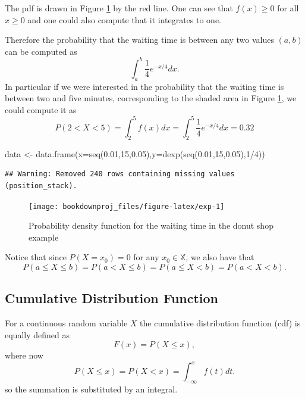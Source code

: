 \documentclass[
]{book}
\newenvironment{Shaded}{\begin{snugshade}}{\end{snugshade}}
\newcommand{\AttributeTok}[1]{\textcolor[rgb]{0.77,0.63,0.00}{#1}}
\newcommand{\DecValTok}[1]{\textcolor[rgb]{0.00,0.00,0.81}{#1}}
\newcommand{\FloatTok}[1]{\textcolor[rgb]{0.00,0.00,0.81}{#1}}
\newcommand{\FunctionTok}[1]{\textcolor[rgb]{0.00,0.00,0.00}{#1}}
\newcommand{\NormalTok}[1]{#1}
\newcommand{\OtherTok}[1]{\textcolor[rgb]{0.56,0.35,0.01}{#1}}
\newcommand{\SpecialCharTok}[1]{\textcolor[rgb]{0.00,0.00,0.00}{#1}}
\theoremstyle{definition}
\theoremstyle{definition}
\theoremstyle{definition}
\theoremstyle{definition}
\theoremstyle{remark}
\begin{document}
The pdf is drawn in Figure \ref{fig:exp} by the red line. One can see that \(f(x)\geq 0\) for all \(x\geq 0\) and one could also compute that it integrates to one.

Therefore the probability that the waiting time is between any two values \((a,b)\) can be computed as
\[
\int_a^b\frac{1}{4}e^{-x/4}dx.
\]
In particular if we were interested in the probability that the waiting time is between two and five minutes, corresponding to the shaded area in Figure \ref{fig:exp}, we could compute it as
\[
P(2<X<5)=\int_2^5f(x)dx=\int_{2}^5\frac{1}{4}e^{-x/4}dx= 0.32
\]

\begin{Shaded}
\begin{Highlighting}[]
\NormalTok{data }\OtherTok{\textless{}{-}} \FunctionTok{data.frame}\NormalTok{(}\AttributeTok{x=}\FunctionTok{seq}\NormalTok{(}\FloatTok{0.01}\NormalTok{,}\DecValTok{15}\NormalTok{,}\FloatTok{0.05}\NormalTok{),}\AttributeTok{y=}\FunctionTok{dexp}\NormalTok{(}\FunctionTok{seq}\NormalTok{(}\FloatTok{0.01}\NormalTok{,}\DecValTok{15}\NormalTok{,}\FloatTok{0.05}\NormalTok{),}\DecValTok{1}\SpecialCharTok{/}\DecValTok{4}\NormalTok{))}
\end{Highlighting}
\end{Shaded}

\begin{verbatim}
## Warning: Removed 240 rows containing missing values (position_stack).
\end{verbatim}

\begin{figure}

{\centering \texttt{[image: bookdownproj\_files/figure-latex/exp-1]} 

}

\caption{Probability density function for the waiting time in the donut shop example}\label{fig:exp}
\end{figure}

Notice that since \(P(X=x_0)=0\) for any \(x_0\in\mathbb{X}\), we also have that
\[
P(a\leq X \leq b)=P(a < X \leq b) = P(a\leq X < b) = P(a<X<b).
\]

\hypertarget{cumulative-distribution-function-1}{%
\subsection{Cumulative Distribution Function}\label{cumulative-distribution-function-1}}

For a continuous random variable \(X\) the cumulative distribution function (cdf) is equally defined as
\[
F(x) = P(X \leq x),
\]
where now
\[
P(X \leq x) = P(X < x) = \int_{-\infty}^xf(t)dt.
\]
so the summation is substituted by an integral.
\end{document}
